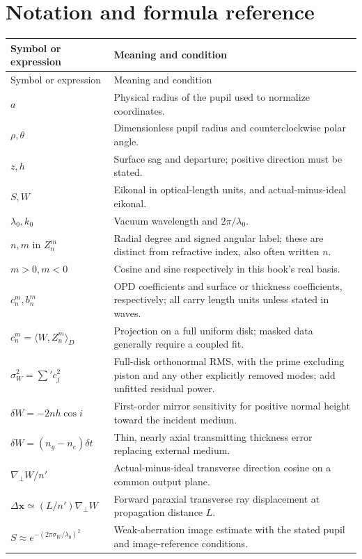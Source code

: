 \chapter*{Notation and formula reference}
\begin{longtable}{@{}p{}p{}@{}}
\toprule Symbol or expression & Meaning and condition\\\midrule\endfirsthead
\toprule Symbol or expression & Meaning and condition\\\midrule\endhead
$a$ & Physical radius of the pupil used to normalize coordinates.\\
$\rho,\theta$ & Dimensionless pupil radius and counterclockwise polar angle.\\
$z,h$ & Surface sag and departure; positive direction must be stated.\\
$S,W$ & Eikonal in optical-length units, and actual-minus-ideal eikonal.\\
$\lambda_0,k_0$ & Vacuum wavelength and $2\pi/\lambda_0$.\\
$n,m$ in $Z_n^m$ & Radial degree and signed angular label;
these are distinct from refractive index, also often written $n$.\\
$m>0,m<0$ & Cosine and sine respectively in this book's real basis.\\
$c_n^m,b_n^m$ & OPD coefficients and surface or thickness coefficients,
respectively; all carry length units unless stated in waves.\\
$c_n^m=\langle W,Z_n^m\rangle_D$ & Projection on a full uniform disk;
masked data generally require a coupled fit.\\
$\sigma_W^2=\sum'c_j^2$ & Full-disk orthonormal RMS, with the prime excluding
piston and any other explicitly removed modes; add unfitted residual power.\\
$\delta W=-2nh\cos i$ & First-order mirror sensitivity for positive
normal height toward the incident medium.\\
$\delta W=(n_g-n_e)\delta t$ & Thin, nearly axial transmitting thickness
error replacing external medium.\\
$\nabla_\perp W/n'$ & Actual-minus-ideal transverse direction cosine on
a common output plane.\\
$\Delta\bm x\simeq(L/n')\nabla_\perp W$ & Forward paraxial transverse
ray displacement at propagation distance $L$.\\
$S\approx e^{-(2\pi\sigma_W/\lambda_0)^2}$ & Weak-aberration image estimate
with the stated pupil and image-reference conditions.\\
\bottomrule
\end{longtable}

